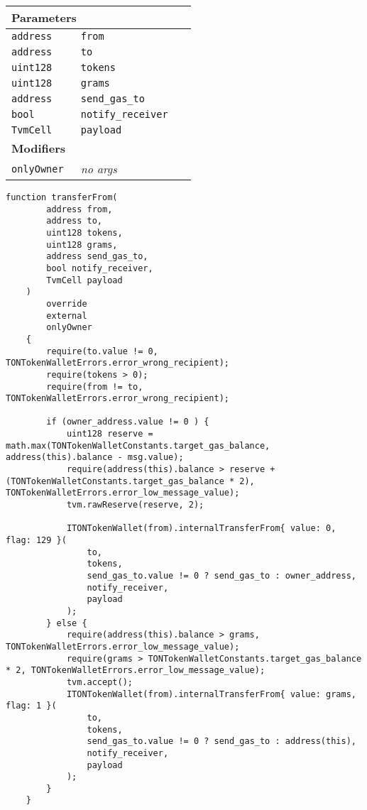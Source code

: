 \ifsoltables
\noindent\begin{tabular}{|l|l|p{5cm}|}\hline
\multicolumn{3}{|l|}{\bf Parameters}\\\hline
\tt address & \tt from &\\\hline
\tt address & \tt to &\\\hline
\tt uint128 & \tt tokens &\\\hline
\tt uint128 & \tt grams &\\\hline
\tt address & \tt send\_{}gas\_{}to &\\\hline
\tt bool & \tt notify\_{}receiver &\\\hline
\tt TvmCell & \tt payload &\\\hline
\multicolumn{3}{|l|}{\bf Modifiers}\\\hline
\tt onlyOwner & {\em no args} &\\\hline
\end{tabular}
\fi

\vspace{2cm}

\begin{lstlisting}[firstnumber=317]
    function transferFrom(
        address from,
        address to,
        uint128 tokens,
        uint128 grams,
        address send_gas_to,
        bool notify_receiver,
        TvmCell payload
    )
        override
        external
        onlyOwner
    {
        require(to.value != 0, TONTokenWalletErrors.error_wrong_recipient);
        require(tokens > 0);
        require(from != to, TONTokenWalletErrors.error_wrong_recipient);

        if (owner_address.value != 0 ) {
            uint128 reserve = math.max(TONTokenWalletConstants.target_gas_balance, address(this).balance - msg.value);
            require(address(this).balance > reserve + (TONTokenWalletConstants.target_gas_balance * 2), TONTokenWalletErrors.error_low_message_value);
            tvm.rawReserve(reserve, 2);

            ITONTokenWallet(from).internalTransferFrom{ value: 0, flag: 129 }(
                to,
                tokens,
                send_gas_to.value != 0 ? send_gas_to : owner_address,
                notify_receiver,
                payload
            );
        } else {
            require(address(this).balance > grams, TONTokenWalletErrors.error_low_message_value);
            require(grams > TONTokenWalletConstants.target_gas_balance * 2, TONTokenWalletErrors.error_low_message_value);
            tvm.accept();
            ITONTokenWallet(from).internalTransferFrom{ value: grams, flag: 1 }(
                to,
                tokens,
                send_gas_to.value != 0 ? send_gas_to : address(this),
                notify_receiver,
                payload
            );
        }
    }
\end{lstlisting}


